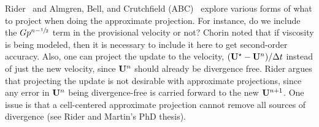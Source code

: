 Rider~\cite{rider} and Almgren, Bell, and Crutchfield (ABC)~\cite{ABC}
explore various forms of what to project when doing the approximate
projection.  For instance, do we include the $Gp^{n-{\sfrac{1}{2}}}$ term in the
provisional velocity or not?  Chorin noted that if viscosity is being
modeled, then it is necessary to include it here to get second-order
accuracy.  Also, one can project the update to the velocity, $({\bf U}^\star
- {\bf U}^n)/\Delta t$ instead of just the new velocity, since ${\bf U}^n$ should
already be divergence free.  Rider argues that projecting the update
is not desirable with approximate projections, since any error in
${\bf U}^n$ being divergence-free is carried forward to the new ${\bf U}^{n+1}$.
One issue is that a cell-centered approximate projection cannot remove
all sources of divergence (see Rider and Martin's PhD thesis).

